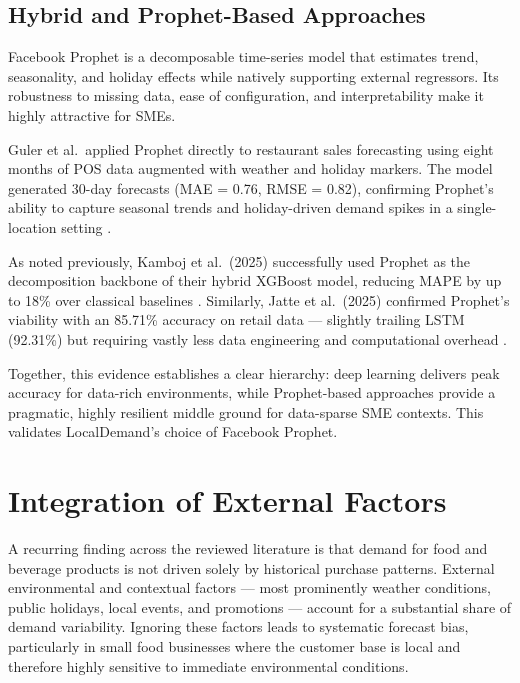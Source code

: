 \documentclass[conference]{IEEEtran}
\begin{document}
\subsection{Hybrid and Prophet-Based Approaches}

Facebook Prophet is a decomposable time-series model that estimates trend, 
seasonality, and holiday effects while natively supporting external regressors. 
Its robustness to missing data, ease of configuration, and interpretability 
make it highly attractive for SMEs.

Guler et al.\ applied Prophet directly to restaurant sales forecasting using 
eight months of POS data augmented with weather and holiday markers. The 
model generated 30-day forecasts (MAE = 0.76, RMSE = 0.82), confirming 
Prophet's ability to capture seasonal trends and holiday-driven demand spikes 
in a single-location setting \cite{guler}.

As noted previously, Kamboj et al.\ (2025) successfully used Prophet as the 
decomposition backbone of their hybrid XGBoost model, reducing MAPE by up to 
18\% over classical baselines \cite{kamboj2025}. Similarly, Jatte et al.\ 
(2025) confirmed Prophet's viability with an 85.71\% accuracy on retail data 
--- slightly trailing LSTM (92.31\%) but requiring vastly less data engineering 
and computational overhead \cite{jatte2025}.

Together, this evidence establishes a clear hierarchy: deep learning delivers 
peak accuracy for data-rich environments, while Prophet-based approaches 
provide a pragmatic, highly resilient middle ground for data-sparse SME 
contexts. This validates LocalDemand's choice of Facebook Prophet.

\section{Integration of External Factors}

A recurring finding across the reviewed literature is that demand for
food and beverage products is not driven solely by historical purchase
patterns. External environmental and contextual factors --- most
prominently weather conditions, public holidays, local events, and
promotions --- account for a substantial share of demand variability.
Ignoring these factors leads to systematic forecast bias, particularly
in small food businesses where the customer base is local and therefore
highly sensitive to immediate environmental conditions.
\end{document}
